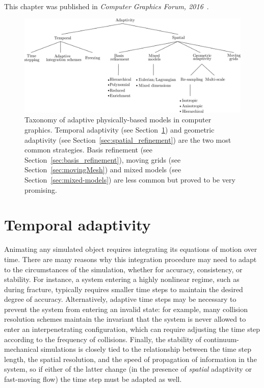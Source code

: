 \paragraph*{}
This chapter was published in \emph{Computer Graphics Forum, 2016}~\cite{Manteaux2016}.
\begin{figure}[!h]
	\centering
	\includegraphics[width=\linewidth]{images/starAdaptivity-cgf2016/taxonomy.png}
	\caption[STAR adaptivity: Taxonomy]{\label{fig:taxonomy}Taxonomy of adaptive physically-based models in computer graphics. Temporal adaptivity (see Section~\ref{sec t adaptivity}) and geometric adaptivity (see Section~\ref{sec:spatial_refinement}) are the two most common strategies. Basis refinement (see Section~\ref{sec:basis_refinement}), moving grids (see Section~\ref{sec:movingMesh}) and mixed models (see Section~\ref{sec:mixed-models}) are less common but proved to be very promising.}
\end{figure}

\section{Temporal adaptivity} \label{sec t adaptivity}
Animating any simulated object requires integrating its equations of motion over time.
There are many reasons why this integration procedure may need to adapt to the circumstances of the simulation, whether for accuracy, consistency, or stability.
For instance, a system entering a highly nonlinear regime, such as during fracture, typically requires smaller time steps to maintain the desired degree of accuracy.
Alternatively, adaptive time steps may be necessary to prevent the system from entering an invalid state: for example, many collision resolution schemes maintain the invariant that the system is never allowed to enter an interpenetrating configuration, which can require adjusting the time step according to the frequency of collisions.
Finally, the stability of continuum-mechanical simulations is closely tied to the relationship between the time step length, the spatial resolution, and the speed of propagation of information in the system, so if either of the latter change (in the presence of \emph{spatial} adaptivity or fast-moving flow) the time step must be adapted as well.

